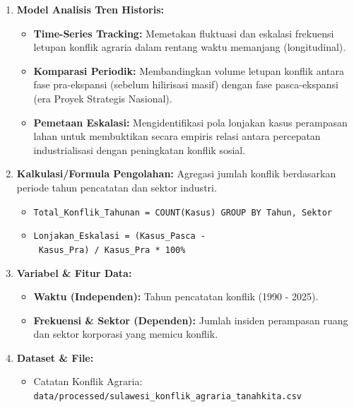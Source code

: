 \documentclass[
]{article}
\providecommand{\tightlist}{%
  \setlength{\itemsep}{0pt}\setlength{\parskip}{0pt}}
\begin{document}
\begin{enumerate}
\def\labelenumi{\arabic{enumi}.}
\tightlist
\item
  \textbf{Model Analisis Tren Historis:}

  \begin{itemize}
  \tightlist
  \item
    \textbf{Time-Series Tracking:} Memetakan fluktuasi dan eskalasi
    frekuensi letupan konflik agraria dalam rentang waktu memanjang
    (longitudinal).
  \item
    \textbf{Komparasi Periodik:} Membandingkan volume letupan konflik
    antara fase pra-ekspansi (sebelum hilirisasi masif) dengan fase
    pasca-ekspansi (era Proyek Strategis Nasional).
  \item
    \textbf{Pemetaan Eskalasi:} Mengidentifikasi pola lonjakan kasus
    perampasan lahan untuk membuktikan secara empiris relasi antara
    percepatan industrialisasi dengan peningkatan konflik sosial.
  \end{itemize}
\item
  \textbf{Kalkulasi/Formula Pengolahan:} Agregasi jumlah konflik
  berdasarkan periode tahun pencatatan dan sektor industri.

  \begin{itemize}
  \tightlist
  \item
    \texttt{Total\_Konflik\_Tahunan\ =\ COUNT(Kasus)\ GROUP\ BY\ Tahun,\ Sektor}
  \item
    \texttt{Lonjakan\_Eskalasi\ =\ (Kasus\_Pasca\ -\ Kasus\_Pra)\ /\ Kasus\_Pra\ *\ 100\%}
  \end{itemize}
\item
  \textbf{Variabel \& Fitur Data:}

  \begin{itemize}
  \tightlist
  \item
    \textbf{Waktu (Independen):} Tahun pencatatan konflik (1990 - 2025).
  \item
    \textbf{Frekuensi \& Sektor (Dependen):} Jumlah insiden perampasan
    ruang dan sektor korporasi yang memicu konflik.
  \end{itemize}
\item
  \textbf{Dataset \& File:}

  \begin{itemize}
  \tightlist
  \item
    Catatan Konflik Agraria:
    \texttt{data/processed/sulawesi\_konflik\_agraria\_tanahkita.csv}
  \end{itemize}
\end{enumerate}
\end{document}
